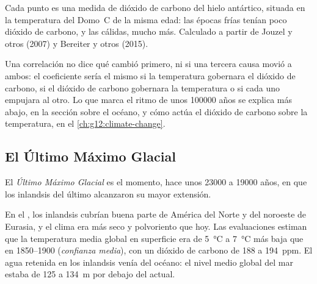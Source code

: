 \begin{omfigure}

{\small Cada punto es una medida de dióxido de carbono del hielo antártico,
situada en la temperatura del Domo~C de la misma edad: las épocas frías tenían poco dióxido
de carbono, y las cálidas, mucho más. Calculado a partir de Jouzel y otros (2007) y
Bereiter y otros (2015).}
\end{omfigure}

Una correlación no dice qué cambió primero, ni si una tercera causa
movió a ambos: el coeficiente sería el mismo si la temperatura gobernara el dióxido
de carbono, si el dióxido de carbono gobernara la temperatura o si cada uno empujara al otro.
Lo que marca el ritmo de unos \num{100000} años se explica más abajo, en la sección sobre
el océano, y cómo actúa el dióxido de carbono sobre la temperatura, en
el \cref{ch:g12:climate-change}.

\subsection{El Último Máximo Glacial}

\begin{definition}\label{def:g12:past-climates:lgm}
El \emph{Último Máximo Glacial} es el momento, hace unos
\num{23000} a \num{19000} años, en que los inlandsis del último 
alcanzaron su mayor extensión.
\end{definition}

En el , los inlandsis cubrían buena parte de América del Norte y del
noroeste de Eurasia, y el clima era más seco y polvoriento que hoy. Las
evaluaciones estiman que la temperatura media global en superficie era de \qty{5}{\degreeCelsius}
a \qty{7}{\degreeCelsius} más baja que en 1850--1900 (\emph{confianza media}),
con un dióxido de carbono de 188 a \qty{194}{ppm}. El agua retenida en los
inlandsis venía del océano: el nivel medio global del mar estaba de 125 a \qty{134}{m}
por debajo del actual.

